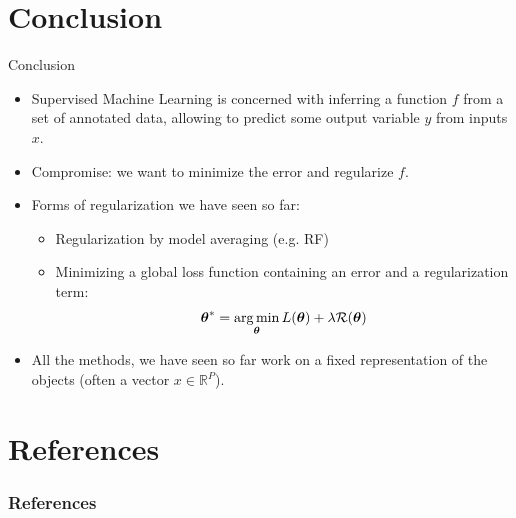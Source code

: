 \documentclass[xcolor=pdftex,dvipsnames,table]{beamer}
\begin{document}

\section{Conclusion}
\begin{frame}{Conclusion}
	\begin{itemize}
		\item Supervised Machine Learning is concerned with inferring a function $f$ from a set of annotated data, allowing to predict some output variable $y$ from inputs $x$.
		\item Compromise: we want to minimize the error and regularize $f$.
		\item Forms of regularization we have seen so far:
			\begin{itemize}
				\item Regularization by model averaging (e.g. RF)
				\item Minimizing a global loss function containing an error and a regularization term:
				\begin{equation*}
					\boldsymbol{\theta} ^{\ast} = \operatorname*{arg\,min}_{\boldsymbol{\theta}} L (\boldsymbol{\theta}) + \lambda \mathcal{R}(\boldsymbol{\theta})
				\end{equation*}
			\end{itemize}
		\item All the methods, we have seen so far work on a fixed representation of the objects (often a vector $x \in\mathbb{R}^P$).
	\end{itemize}
\end{frame}

\section{References}
\begin{frame}[allowframebreaks]
	\frametitle{References}
	
\end{frame}
\end{document}
